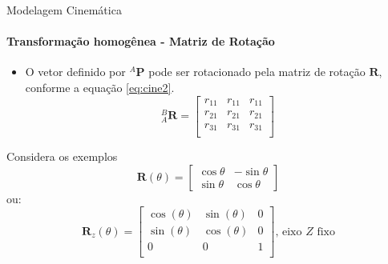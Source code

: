 \documentclass{beamer}
\begin{document}
\begin{frame}{Modelagem Cinemática}
    \framesubtitle{Transformação homogênea - Matriz de Rotação}
    \begin{itemize}
        \item O vetor definido por ${}^A\mathbf{P}$ pode ser rotacionado pela matriz de rotação $\mathbf{R}$, conforme a equação \eqref{eq:cine2}.
              \begin{equation}\label{eq:cine2}
                  {}_A^B
                  \mathbf{R} =
                  \begin{bmatrix}
                      r_{11} & r_{11} & r_{11} \\
                      r_{21} & r_{21} & r_{21} \\
                      r_{31} & r_{31} & r_{31} \\
                  \end{bmatrix}
              \end{equation}
    \end{itemize}

    \begin{block}{Considera os exemplos}
        \begin{equation*}
            \mathbf{R}(\theta) =
            \begin{bmatrix}
                \cos \theta & -\sin \theta \\\sin \theta &\cos \theta
            \end{bmatrix}
        \end{equation*}
        ou:
        \begin{equation*}
            \mathbf{R}_z(\theta) =
            \begin{bmatrix}
                \cos(\theta) & \sin(\theta) & 0 \\
                \sin(\theta) & \cos(\theta) & 0 \\
                0            & 0            & 1 \\
            \end{bmatrix} \text{, eixo $Z$ fixo}
        \end{equation*}
    \end{block}

\end{frame}
\end{document}

